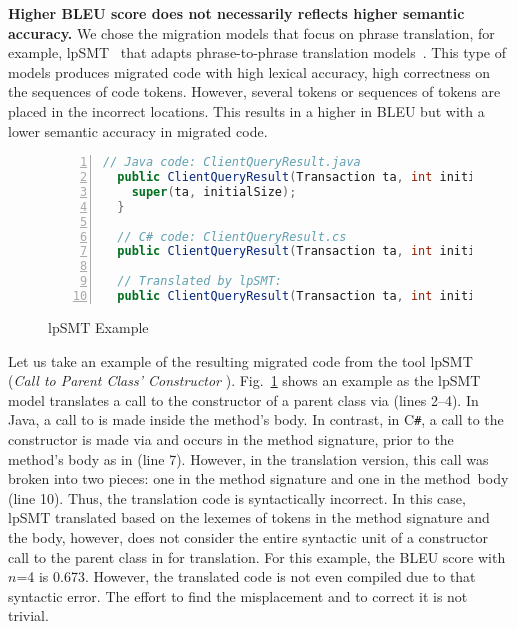 {\bf Higher BLEU score does not necessarily reflects higher semantic
  accuracy.}  We chose the migration models that focus on phrase
translation, for example, lpSMT~\cite{fse13-nier,karaivanov14} that
adapts phrase-to-phrase translation models~\cite{phrasal10}. This type
of models produces migrated code with high lexical accuracy, \ie
high correctness on the sequences of code tokens. However, several
tokens or sequences of tokens are placed in the incorrect locations.
This results in a higher in BLEU but with a lower semantic accuracy
in migrated code.

\begin{figure}[t]
\centering
\begin{lstlisting}[basicstyle=\scriptsize\sffamily, stepnumber=1, numbers=left, language=Java, aboveskip=1pt,  belowskip=1pt, numbersep=-5pt]
  // Java code: ClientQueryResult.java
  public ClientQueryResult(Transaction ta, int initialSize){
    super(ta, initialSize);
  }

  // C# code: ClientQueryResult.cs
  public ClientQueryResult(Transaction ta, int initialSize) : base(ta, initialSize) {}

  // Translated by lpSMT:
  public ClientQueryResult(Transaction ta, int initialSize) : base(ta {, initialSize) ; }
\end{lstlisting}
\caption{lpSMT Example~\cite{fse13-nier}}
\label{fig:issueexample2}
\end{figure}


Let us take an example of the resulting migrated code from the tool
lpSMT~\cite{fse13-nier} ({\em Call to Parent Class' Constructor
  }). Fig.~\ref{fig:issueexample2} shows an example
as the lpSMT model translates a call to the constructor of a parent
class via  (lines 2--4). In Java, a call to  is
made inside the method's body. In contrast, in C\texttt{\#}, a call to the
constructor is made via  and occurs in the method
signature, \ie prior to the method's body as in
 (line 7). However, in the translation
version, this call was broken into two pieces: one in the method
signature  and one in the method~body\\  (line 10). Thus, the translation code is
syntactically incorrect. In this case, lpSMT translated based on the
lexemes of tokens in the method signature and the body, however, does
not consider the entire syntactic unit of a constructor call to the
parent class in  for translation. For this example, the
BLEU score with $n$=4 is 0.673. However, the translated code is not even
compiled due to that syntactic error. The effort to find the
misplacement and to correct it is not trivial.

